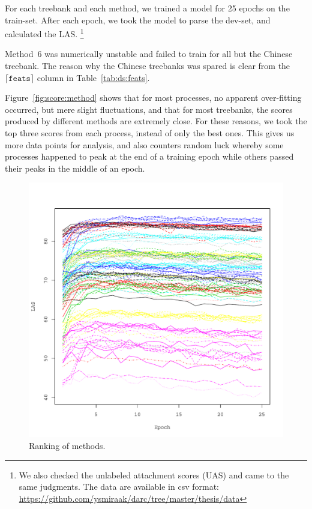 \documentclass[11pt]{article}
\begin{document}
For each treebank and each method,
we trained a model for 25 epochs on the train-set.
After each epoch, we took the model to parse the dev-set,
and calculated the LAS\@.%
\footnote{We also checked the unlabeled attachment scores (UAS) and came to the same judgments.
  The data are available in csv format:
  \url{https://github.com/ysmiraak/darc/tree/master/thesis/data}}

Method~6 was numerically unstable and failed to train for all but the Chinese treebank.
The reason why the Chinese treebanks was spared is clear from the \(\lceil\texttt{feats}\rceil\) column in Table~\ref{tab:ds:feats}.

Figure~\ref{fig:score:method} shows that for most processes,
no apparent over-fitting occurred, but mere slight fluctuations,
and that for most treebanks, the scores produced by different methods are extremely close.
For these reasons, we took the top three scores from each process,
instead of only the best ones.
This gives us more data points for analysis,
and also counters random luck whereby some processes happened to peak at the end of a training epoch
while others passed their peaks in the middle of an epoch.

\begin{figure}[htb!]
  \centering
  \includegraphics[width=\textwidth,page=2]{bachelor_thesis_plots.pdf}
  \caption[]{\label{fig:rank:method}Ranking of methods.}
\end{figure}
\end{document}

